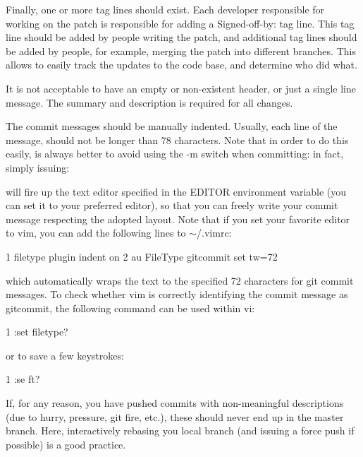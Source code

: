 Finally, one or more tag lines should exist. Each developer responsible for working on the patch is responsible for adding a {\ttfamily Signed-\/off-\/by\+:} tag line. This tag line should be added by people writing the patch, and additional tag lines should be added by people, for example, merging the patch into different branches. This allows to easily track the updates to the code base, and determine who did what.

It is not acceptable to have an empty or non-\/existent header, or just a single line message. The summary and description is required for all changes.

The commit messages should be manually indented. Usually, each line of the message, should not be longer than 78 characters. Note that in order to do this easily, is always better to avoid using the {\ttfamily -\/m} switch when committing\+: in fact, simply issuing\+:




will fire up the text editor specified in the {\ttfamily E\+D\+I\+T\+OR} environment variable (you can set it to your preferred editor), so that you can freely write your commit message respecting the adopted layout. Note that if you set your favorite editor to vim, you can add the following lines to $\sim$/.vimrc\+:


\begin{DoxyCode}
1 filetype plugin indent on
2 au FileType gitcommit set tw=72
\end{DoxyCode}


which automatically wraps the text to the specified 72 characters for git commit messages. To check whether vim is correctly identifying the commit message as gitcommit, the following command can be used within vi\+:


\begin{DoxyCode}
1 :set filetype?
\end{DoxyCode}


or to save a few keystrokes\+:


\begin{DoxyCode}
1 :se ft?
\end{DoxyCode}


If, for any reason, you have pushed commits with non-\/meaningful descriptions (due to hurry, pressure, {\ttfamily git fire}, etc.), these should never end up in the {\ttfamily master} branch. Here, interactively rebasing you local branch (and issuing a force push if possible) is a good practice. 